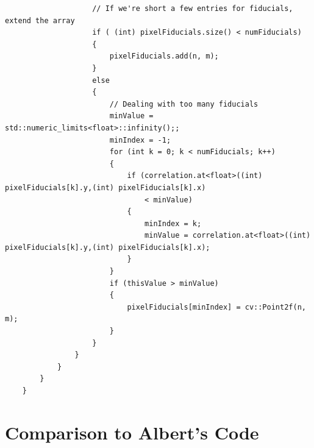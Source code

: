 \documentclass[10pt]{scrartcl}
\begin{document}
\begin{lstlisting}
                    // If we're short a few entries for fiducials, extend the array
                    if ( (int) pixelFiducials.size() < numFiducials)
                    {
                        pixelFiducials.add(n, m);
                    }
                    else
                    {
                        // Dealing with too many fiducials
                        minValue = std::numeric_limits<float>::infinity();;
                        minIndex = -1;
                        for (int k = 0; k < numFiducials; k++)
                        {
                            if (correlation.at<float>((int) pixelFiducials[k].y,(int) pixelFiducials[k].x) 
                                < minValue)
                            {
                                minIndex = k;
                                minValue = correlation.at<float>((int) pixelFiducials[k].y,(int) pixelFiducials[k].x);
                            }   
                        }
                        if (thisValue > minValue)
                        {
                            pixelFiducials[minIndex] = cv::Point2f(n, m);
                        }
                    }
                }
            }
        }
    }
\end{lstlisting}



\clearpage

\section{Comparison to Albert's Code} %
\label{sec:comparison_to_albert_s_code}
\end{document}

